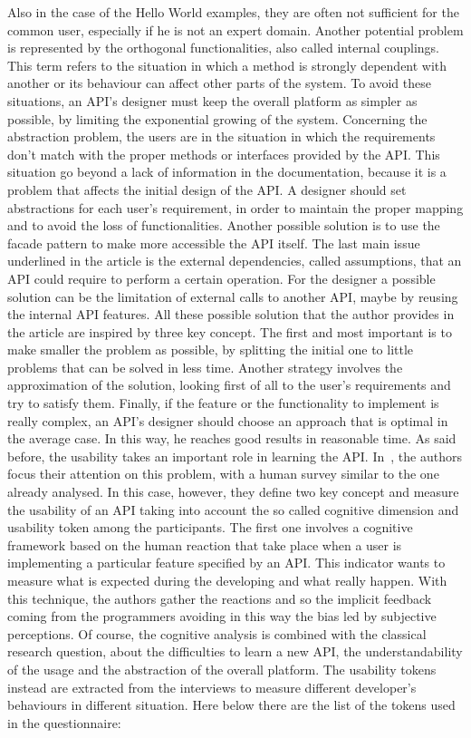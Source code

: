 Also in the case of the Hello World examples, they are often not sufficient for the common user, especially if he is not an expert domain. Another potential problem is represented by the orthogonal functionalities, also called internal couplings. This term refers to the situation in which a method is strongly dependent with another or its behaviour can affect other parts of the system. To avoid these situations, an API's designer must keep the overall platform as simpler as possible, by limiting the exponential growing of the system. Concerning the abstraction problem, the users are in the situation in which the requirements don't match with the proper methods or interfaces provided by the API. This situation go beyond a lack of information in the documentation, because it is a problem that affects the initial design of the API. A designer should set abstractions for each user's requirement, in order to maintain the proper mapping and to avoid the loss of functionalities. Another possible solution is to use the facade pattern to make more accessible the API itself. The last main issue underlined in the article is the external dependencies, called assumptions, that an API could require to perform a certain operation. For the designer a possible solution can be the limitation of external calls to another API, maybe by reusing the internal API features. \newline
All these possible solution that the author provides in the article are inspired by three key concept. The first and most important is to make smaller the problem as possible, by splitting the initial one to little problems that can be solved in less time. Another strategy involves the approximation of the solution, looking first of all to the user's requirements and try to satisfy them. Finally, if the feature or the functionality to implement is really complex, an API's designer should choose an approach that is optimal in the average case. In this way, he reaches good results in reasonable time.\newline
As said before, the usability takes an important role in learning the API. In~\cite{marco_piccioni_empirical_2013}, the authors focus their attention on this problem, with a human survey similar to the one already analysed. In this case, however, they define two key concept and measure the usability of an API taking into account the so called cognitive dimension and usability token among the participants. The first one involves a cognitive framework based on the human reaction that take place when a user is implementing a particular feature specified by an API. This indicator wants to measure what is expected during the developing and what really happen. With this technique, the authors gather the reactions and so the implicit feedback coming from the programmers avoiding in this way the bias led by subjective perceptions. Of course, the cognitive analysis is combined with the classical research question, about the difficulties to learn a new API, the understandability of the usage and the abstraction of the overall platform. The usability tokens instead are extracted from the interviews to measure different developer's behaviours in different situation. Here below there are the list of the tokens used in the questionnaire:
